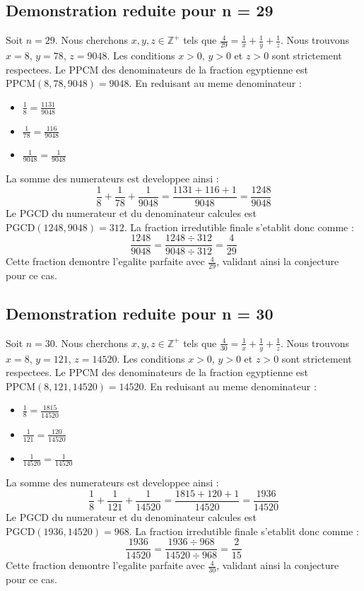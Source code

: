 \documentclass[11pt,a4paper]{article}
\begin{document}
\subsection{Demonstration reduite pour n = 29}
Soit $n = 29$. Nous cherchons $x, y, z \in \mathbb{Z}^{+}$ tels que $\frac{4}{29} = \frac{1}{x} + \frac{1}{y} + \frac{1}{z}$.
Nous trouvons $x = 8$, $y = 78$, $z = 9048$.
Les conditions $x > 0$, $y > 0$ et $z > 0$ sont strictement respectees.
Le PPCM des denominateurs de la fraction egyptienne est $\text{PPCM}(8, 78, 9048) = 9048$.
En reduisant au meme denominateur :
\begin{itemize}
    \item $\frac{1}{8} = \frac{1131}{9048}$
    \item $\frac{1}{78} = \frac{116}{9048}$
    \item $\frac{1}{9048} = \frac{1}{9048}$
\end{itemize}
La somme des numerateurs est developpee ainsi :
$$ \frac{1}{8} + \frac{1}{78} + \frac{1}{9048} = \frac{1131 + 116 + 1}{9048} = \frac{1248}{9048} $$
Le PGCD du numerateur et du denominateur calcules est $\text{PGCD}(1248, 9048) = 312$.
La fraction irredutible finale s'etablit donc comme :
$$ \frac{1248}{9048} = \frac{1248 \div 312}{9048 \div 312} = \frac{4}{29} $$
Cette fraction demontre l'egalite parfaite avec $\frac{4}{29}$, validant ainsi la conjecture pour ce cas.

\subsection{Demonstration reduite pour n = 30}
Soit $n = 30$. Nous cherchons $x, y, z \in \mathbb{Z}^{+}$ tels que $\frac{4}{30} = \frac{1}{x} + \frac{1}{y} + \frac{1}{z}$.
Nous trouvons $x = 8$, $y = 121$, $z = 14520$.
Les conditions $x > 0$, $y > 0$ et $z > 0$ sont strictement respectees.
Le PPCM des denominateurs de la fraction egyptienne est $\text{PPCM}(8, 121, 14520) = 14520$.
En reduisant au meme denominateur :
\begin{itemize}
    \item $\frac{1}{8} = \frac{1815}{14520}$
    \item $\frac{1}{121} = \frac{120}{14520}$
    \item $\frac{1}{14520} = \frac{1}{14520}$
\end{itemize}
La somme des numerateurs est developpee ainsi :
$$ \frac{1}{8} + \frac{1}{121} + \frac{1}{14520} = \frac{1815 + 120 + 1}{14520} = \frac{1936}{14520} $$
Le PGCD du numerateur et du denominateur calcules est $\text{PGCD}(1936, 14520) = 968$.
La fraction irredutible finale s'etablit donc comme :
$$ \frac{1936}{14520} = \frac{1936 \div 968}{14520 \div 968} = \frac{2}{15} $$
Cette fraction demontre l'egalite parfaite avec $\frac{4}{30}$, validant ainsi la conjecture pour ce cas.
\end{document}

